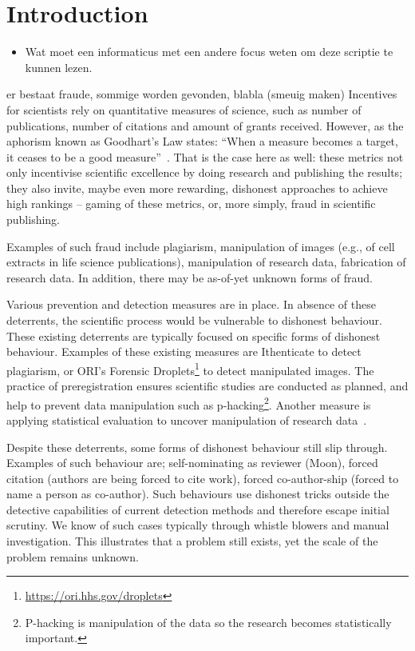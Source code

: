 \documentclass{ou-report}
\newcommand{\HJ}[1]{{\color{red} HJ: #1}}
\newcommand{\outline}[1]{{\color{blue} #1}}
\begin{document}
\chapter{Introduction}
\outline{
\begin{itemize}
    \item Wat moet een informaticus met een andere focus weten om deze scriptie 
        te kunnen lezen.
\end{itemize}
}
\outline{
    er bestaat fraude, sommige worden gevonden, blabla (smeuig maken)
}
Incentives for scientists rely on quantitative measures of science, such as 
number of publications, number of citations and amount of grants received. 
However, as the aphorism known as Goodhart's Law states: ``When a measure 
becomes a target, it ceases to be a good measure''~\cite{strathern_1997}. That 
is the case here as well: these metrics not only incentivise scientific 
excellence by doing research and publishing the results; they also invite, 
maybe even more rewarding, dishonest approaches to achieve high rankings 
-- gaming of these metrics, or, more simply, fraud in scientific publishing. 

Examples of such fraud include plagiarism, manipulation of images (e.g., of cell 
extracts in life science publications), manipulation of research data, 
fabrication of research data. In addition, there may be as-of-yet unknown forms 
of fraud.

Various prevention and detection measures are in place. In absence of these 
deterrents, the scientific process would be vulnerable to dishonest behaviour. 
These existing deterrents are typically focused on specific forms of dishonest 
behaviour. Examples of these existing measures are Ithenticate to detect 
plagiarism, or ORI's Forensic Droplets\footnote{\url{https://ori.hhs.gov/droplets}} 
to detect manipulated images. The practice of preregistration ensures scientific 
studies are conducted as planned, and help to prevent data manipulation such as 
p-hacking\footnote{P-hacking is manipulation of the data so the research becomes 
statistically important.}. Another measure is applying statistical evaluation to 
uncover manipulation of research data~\cite{HGWA2019}. 

Despite these deterrents, some forms of dishonest behaviour still slip through.
Examples of such behaviour are;
self-nominating as reviewer (Moon), forced citation (authors are being forced
to cite work), forced co-author-ship (forced to name a person as co-author).
Such behaviours use dishonest tricks outside the detective capabilities of
current detection methods and therefore escape initial scrutiny. We know of
such cases typically through whistle blowers and manual investigation. 
This illustrates that a problem still exists, yet the scale of the
problem remains unknown.
\end{document}
